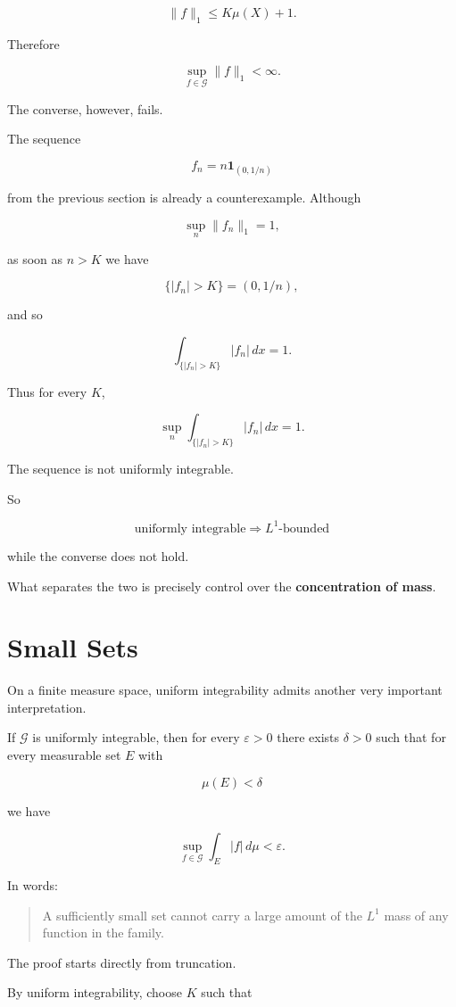 \documentclass[11pt]{article}
\begin{document}
\[
\|f\|_1
\leq
K\mu(X)+1.
\]

Therefore

\[
\sup_{f\in\mathcal G}\|f\|_1<\infty.
\]

The converse, however, fails.

The sequence

\[
f_n=n\mathbf1_{(0,1/n)}
\]

from the previous section is already a counterexample. Although

\[
\sup_n\|f_n\|_1=1,
\]

as soon as $n>K$ we have

\[
\{|f_n|>K\}
=
(0,1/n),
\]

and so

\[
\int_{\{|f_n|>K\}}|f_n|\,dx
=
1.
\]

Thus for every $K$,

\[
\sup_n
\int_{\{|f_n|>K\}}|f_n|\,dx
=
1.
\]

The sequence is not uniformly integrable.

So

\[
\boxed{
\text{uniformly integrable}
\Longrightarrow
L^1\text{-bounded}
}
\]

while the converse does not hold.

What separates the two is precisely control over the \textbf{concentration of mass}.


\section{Small Sets}


On a finite measure space, uniform integrability admits another very important interpretation.

If $\mathcal G$ is uniformly integrable, then for every $\varepsilon>0$ there exists $\delta>0$ such that for every measurable set $E$ with

\[
\mu(E)<\delta
\]

we have

\[
\sup_{f\in\mathcal G}
\int_E|f|\,d\mu
<
\varepsilon.
\]

In words:

\begin{quote}
A sufficiently small set cannot carry a large amount of the $L^1$ mass of any function in the family.
\end{quote}


The proof starts directly from truncation.

By uniform integrability, choose $K$ such that
\end{document}
